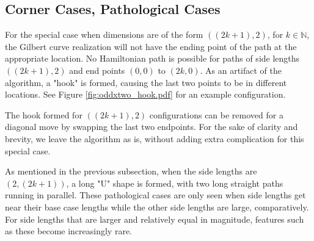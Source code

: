 \subsection{Corner Cases, Pathological Cases}

For the special case when dimensions are of the form $((2k+1),2)$, for $k \in \mathbb{N}$, the Gilbert curve realization will
not have the ending point of the path at the appropriate location.
No Hamiltonian path is possible for paths of side lengths
$((2k+1),2)$ and end points $(0,0)$ to $(2k,0)$.
As an artifact of the algorithm,
a "hook" is formed, causing the last two points to be in different locations.
See Figure \ref{fig:oddxtwo_hook.pdf} for an example configuration.

The hook formed for $((2k+1),2)$ configurations can be removed for a diagonal move by swapping the last two endpoints.
For the sake of clarity and brevity, we leave the algorithm as is, without adding extra complication for this special case.

As mentioned in the previous subsection,
when the side lengths are $(2, (2k+1))$, a long "U" shape is formed, with two long straight paths running in parallel.
These pathological cases are only seen
when side lengths get near their base case lengths while the other side lengths are large, comparatively.
For side lengths that are larger and relatively equal in magnitude, features such as these become increasingly rare.


